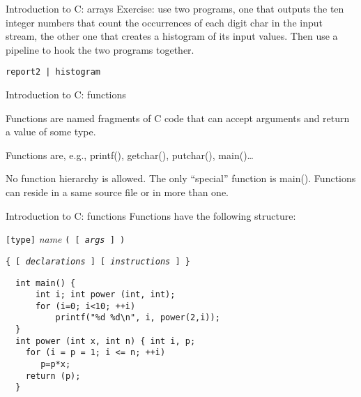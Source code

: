 \begin{frame}[fragile]{Introduction to C: arrays}
Exercise: use two programs, one that outputs the ten integer numbers
that count the occurrences of
each digit char in the input stream, the other one that creates a histogram
of its input values. Then use a pipeline to hook the two programs together.


\vspace{20pt}

\begin{center}
{\tt report2  |  histogram}
\end{center}



\end{frame}
\begin{frame}[fragile]{Introduction to C: functions}

Functions are named fragments of C code that can accept arguments and
return a value of some type.


\vspace{20pt}

Functions are, e.g., printf(), getchar(), putchar(), main()\ldots\


\vspace{20pt}

No function hierarchy is allowed. The only ``special'' function is
main(). Functions can reside in a same source file or in more than one.



\end{frame}
\begin{frame}[fragile]{Introduction to C: functions}
Functions have the following structure: 


\vspace{20pt}

   {\tt [type]} {\em name\/} {\tt ( [ {\em args\/} ] ) }


   {\tt \{ [ {\em declarations\/} ] [ {\em instructions\/} ] \} }


\vspace{20pt}

\begin{tt}
\begin{verbatim}
  int main() {
      int i; int power (int, int);
      for (i=0; i<10; ++i)
          printf("%d %d\n", i, power(2,i));
  }
  int power (int x, int n) { int i, p;
    for (i = p = 1; i <= n; ++i)
       p=p*x;
    return (p);
  }
\end{verbatim}
\end{tt}
\end{frame}

